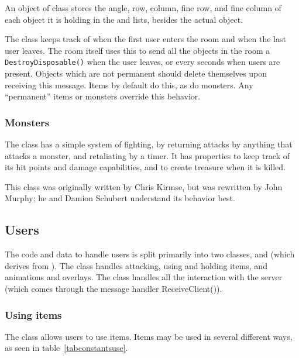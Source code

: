 An object of class  stores the angle, row, column, fine
row, and fine column of each object it is holding in the
 and  lists, besides the actual object.

The  class keeps track of when the first user enters the
room and when the last user leaves.  The room itself uses this to send
all the objects in the room a \texttt{DestroyDisposable()} when the
user leaves, or every  seconds when users are
present.  Objects which are not permanent should delete themselves
upon receiving this message.  Items by default do this, as do
monsters.  Any ``permanent'' items or monsters override this behavior.

\subsubsection{Monsters}

The  class has a simple system of fighting, by
returning attacks by anything that attacks a monster, and retaliating
by a timer.  It has properties to keep track of its hit points and
damage capabilities, and to create treasure when it is killed.

This class was originally written by Chris Kirmse, but was rewritten
by John Murphy; he and Damion Schubert understand its behavior best.

\subsection{Users}
\label{section:users}

The code and data to handle users is split primarily into two classes,
 and  (which derives from ).
The  class handles attacking, using and holding items,
and animations and overlays.  The  class handles all the
interaction with the server (which comes through the message handler
ReceiveClient()).

\subsubsection{Using items}

The  class allows users to use items.  Items may be used
in several different ways, as seen in table~\ref{tabconstantsuse}.

